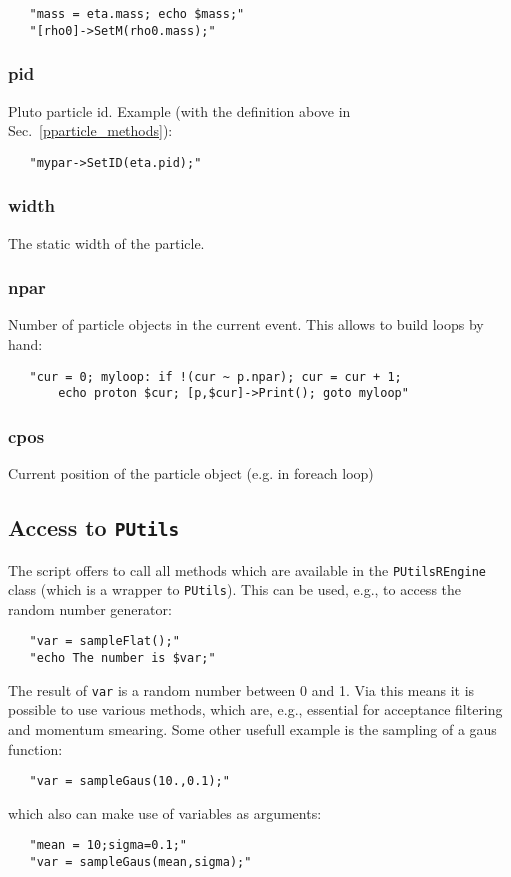 {\begin{verbatim}
   "mass = eta.mass; echo $mass;"
   "[rho0]->SetM(rho0.mass);"
\end{verbatim}

\subsubsection{pid} 

Pluto particle id. Example (with the definition above in
Sec.~\ref{pparticle_methods}):

\begin{verbatim}
   "mypar->SetID(eta.pid);"
\end{verbatim}

\subsubsection{width} 

The static width of the particle.

\subsubsection{npar} \label{npar}

Number of particle objects in the current event. This allows
to build loops by hand:

\begin{verbatim}
   "cur = 0; myloop: if !(cur ~ p.npar); cur = cur + 1; 
       echo proton $cur; [p,$cur]->Print(); goto myloop"
\end{verbatim}

\subsubsection{cpos} 

Current position of the particle object (e.g. in foreach loop)

\subsection{Access to \texttt{PUtils}}

The script offers to call all methods which are available in
the {\tt PUtilsREngine} class (which is a wrapper to {\tt PUtils}). 
This can be used, e.g., to access the random number generator:
\begin{verbatim}
   "var = sampleFlat();"
   "echo The number is $var;"
\end{verbatim}
The result of {\tt var} is a random number between 0 and 1.
Via this means it is possible to use various methods, which are, e.g., essential for
acceptance filtering and momentum smearing. Some other usefull example is the
sampling of a gaus function:
\begin{verbatim}
   "var = sampleGaus(10.,0.1);"
\end{verbatim}
which also can make use of variables as arguments:
\begin{verbatim}
   "mean = 10;sigma=0.1;"
   "var = sampleGaus(mean,sigma);"
\end{verbatim}

}
